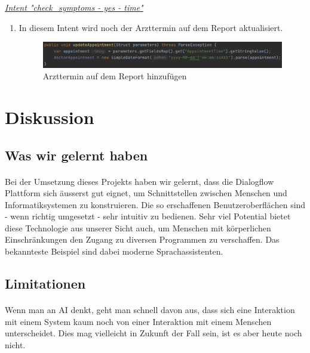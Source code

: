 \documentclass[11pt,a4paper]{article}
\begin{document}
		\underline{\emph{Intent "check\_symptoms - yes - time"}} \\
		\begin{enumerate}
			\item In diesem Intent wird noch der Arzttermin auf dem Report aktualisiert.
			\begin{figure}[h!]
				\begin{center}
            		\includegraphics[width=1.0\linewidth]{JavaClient-UpdateAppointment.png}
					\caption{Arzttermin auf dem Report hinzufügen}
					\label{fig:javaClient_updateAppointment}
				\end{center}
			\end{figure}
		\end{enumerate}
	        
\newpage

\section{Diskussion}
    \subsection{Was wir gelernt haben}
        \paragraph{}
            Bei der Umsetzung dieses Projekts haben wir gelernt, dass die Dialogflow Plattform sich äusserst gut eignet, um Schnittstellen
            zwischen Menschen und Informatiksystemen zu konstruieren. Die so erschaffenen Benutzeroberflächen sind - wenn richtig umgesetzt -
            sehr intuitiv zu bedienen. Sehr viel Potential bietet diese Technologie aus unserer Sicht auch, um Menschen mit körperlichen
            Einschränkungen den Zugang zu diversen Programmen zu verschaffen. Das bekannteste Beispiel sind dabei moderne Sprachassistenten.
            
    \subsection{Limitationen}
        \paragraph{}
            Wenn man an AI denkt, geht man schnell davon aus, dass sich eine Interaktion mit einem System kaum noch von einer Interaktion 
            mit einem Menschen unterscheidet. Dies mag vielleicht in Zukunft der Fall sein, ist es aber heute noch nicht.
            
\end{document}

